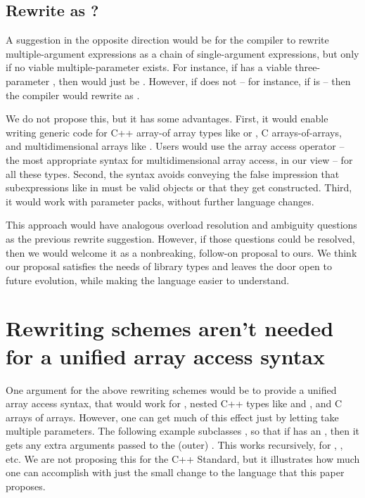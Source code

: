 \documentclass{wg21}
\begin{document}
\subsection{Rewrite  as ?}

A suggestion in the opposite direction would be for the compiler to rewrite multiple-argument  expressions as a chain of single-argument  expressions, but only if no viable multiple-parameter  exists.  For instance, if  has a viable three-parameter , then  would just be .  However, if  does not -- for instance, if  is  -- then the compiler would rewrite  as .

We do not propose this, but it has some advantages.  First, it would enable writing generic code for C++ array-of array types like  or , C arrays-of-arrays, and multidimensional arrays like .  Users would use the array access operator -- the most appropriate syntax for multidimensional array access, in our view -- for all these types.  Second, the syntax avoids conveying the false impression that subexpressions like  in  must be valid objects or that they get constructed.  Third, it would work with parameter packs, without further language changes.

This approach would have analogous overload resolution and ambiguity questions as the previous rewrite suggestion.  However, if those questions could be resolved, then we would welcome it as a nonbreaking, follow-on proposal to ours.  We think our proposal satisfies the needs of library types and leaves the door open to future evolution, while making the language easier to understand.

\section{Rewriting schemes aren't needed for a unified array access syntax}

One argument for the above rewriting schemes would be to provide a unified array access syntax, that would work for , nested C++ types like  and , and C arrays of arrays.  However, one can get much of this effect just by letting  take multiple parameters.  The following example subclasses , so that if  has an , then it gets any extra arguments passed to the (outer) .  This works recursively, for , , etc.  We are not proposing this for the C++ Standard, but it illustrates how much one can accomplish with just the small change to the language that this paper proposes.
\end{document}
